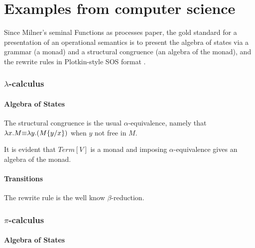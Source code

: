 \section{Examples from computer science}
Since Milner's seminal Functions as processes paper, the gold standard for a presentation of an operational semantics is to present the algebra of states via a grammar (a monad) and a structural congruence (an algebra of the monad), and the rewrite rules in Plotkin-style SOS format \cite{DBLP:journals/mscs/Milner92} \cite{Plotkin04theorigins}.

\subsubsection{$\lambda$-calculus}

\paragraph{Algebra of States}
\begin{mathpar}
\end{mathpar}

The structural congruence is the usual $\alpha$-equivalence, namely that $\lambda x.M \scong \lambda y.(M\{y / x\})$ when $y$ not free in $M$.

It is evident that $Term[V]$ is a monad and imposing $\alpha$-equivalence gives an algebra of the monad.

\paragraph{Transitions}
The rewrite rule is the well know $\beta$-reduction.
\begin{mathpar}
\end{mathpar}

\subsubsection{$\pi$-calculus}

\paragraph{Algebra of States}
\begin{mathpar}
\end{mathpar}

